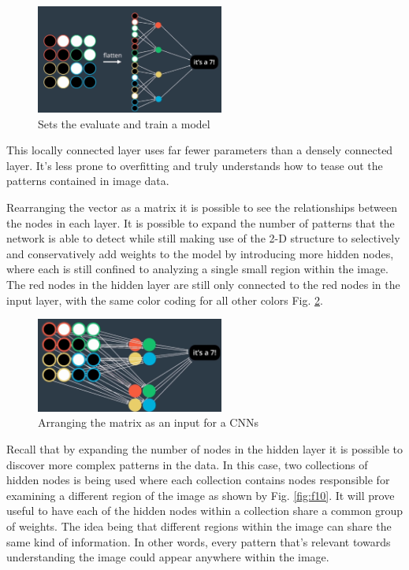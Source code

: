 \documentclass{article}
\begin{document}
\begin{figure}[ht]
    \centering
    \includegraphics[width=0.55\textwidth,height=0.55\textheight,keepaspectratio]{images/sparsely.png}
    \captionsetup{justification=centering}
    \caption{Sets the evaluate and train a model}
    \label{fig:f8}
\end{figure}

This locally connected layer uses far fewer parameters than a densely connected layer. It's less prone to overfitting and truly understands how to tease out the patterns contained in image data. 

Rearranging the vector as a matrix it is possible to see the relationships between the nodes in each layer. It is possible to expand the number of patterns that the network is able to detect while still making use of the 2-D structure to selectively and conservatively add weights to the model by introducing more hidden nodes, where each is still confined to analyzing a single small region within the image. The red nodes in the hidden layer are still only connected to the red nodes in the input layer, with the same color coding for all other colors Fig. \ref{fig:f9}. 

\begin{figure}[ht]
    \centering
    \includegraphics[width=0.55\textwidth,height=0.55\textheight,keepaspectratio]{images/matrix_input.png}
    \captionsetup{justification=centering}
    \caption{Arranging the matrix as an input for a CNNs}
    \label{fig:f9}
\end{figure}

Recall that by expanding the number of nodes in the hidden layer it is possible to discover more complex patterns in the data. In this case, two collections of hidden nodes is being used where each collection contains nodes responsible for examining a different region of the image as shown by Fig. \ref{fig:f10}. It will prove useful to have each of the hidden nodes within a collection share a common group of weights. The idea being that different regions within the image can share the same kind of information. In other words, every pattern that's relevant towards understanding the image could appear anywhere within the image.
\end{document}

